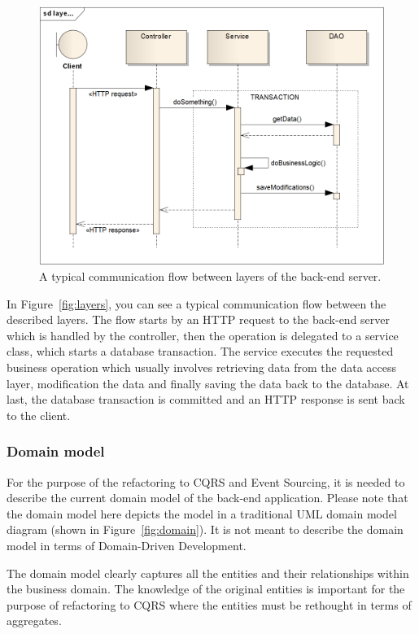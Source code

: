 \documentclass{book}
\begin{document}
\begin{figure}[h!]
\begin{center}
\includegraphics[width=0.7\columnwidth]{figures/layers/layers}
\caption{A typical communication flow between layers of the back-end server.%
}
\end{center}
\end{figure}

In Figure~\ref{fig:layers}, you can see a typical communication flow
between the described layers. The flow starts by an HTTP request to the
back-end server which is handled by the controller, then the operation
is delegated to a service class, which starts a database transaction.
The service executes the requested business operation which usually
involves retrieving data from the data access layer, modification the
data and finally saving the data back to the database. At last, the
database transaction is committed and an HTTP response is sent back to
the client.


\subsubsection{Domain model}\label{domain-model}

For the purpose of the refactoring to CQRS and Event Sourcing, it is
needed to describe the current domain model of the back-end application.
Please note that the domain model here depicts the model in a
traditional UML domain model diagram (shown in Figure~\ref{fig:domain}).
It is not meant to describe the domain model in terms of Domain-Driven
Development.

The domain model clearly captures all the entities and their
relationships within the business domain. The knowledge of the original
entities is important for the purpose of refactoring to CQRS where the
entities must be rethought in terms of aggregates.
\end{document}
